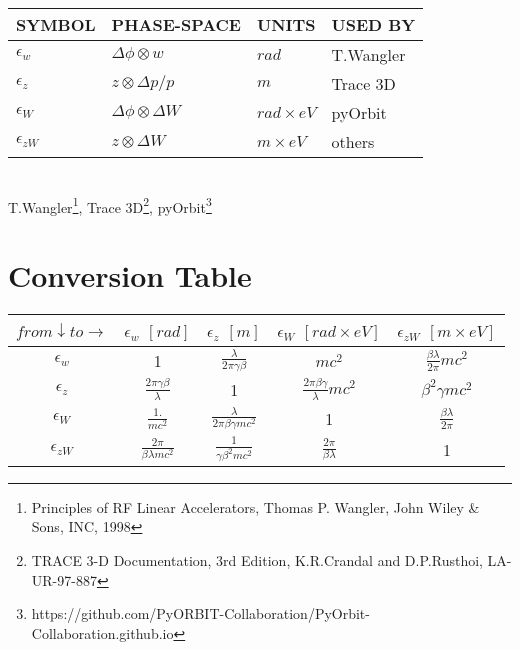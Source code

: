 \documentclass{article}
\begin{document}
\begin{tabular}{|l|l|l|l|}
\hline
SYMBOL   & PHASE-SPACE  &  UNITS & USED BY\\

\hline
$\epsilon_{w}$  & $ \Delta\phi \otimes w$ & $rad$ & T.Wangler \\

\hline
$\epsilon_{z}$  & $z \otimes \Delta p/p$  & $m$ & Trace 3D \\

\hline
$\epsilon_{W}$  & $\Delta\phi \otimes \Delta W$  & $rad\times eV$ & pyOrbit\\

\hline
$\epsilon_{zW}$ & $z \otimes \Delta W$ & $m \times eV$ & others \\

\hline
\end{tabular} \\

T.Wangler\footnote {Principles of RF Linear Accelerators, Thomas P. Wangler, John Wiley \& Sons, INC, 1998},
Trace 3D\footnote {TRACE 3-D Documentation, 3rd Edition, K.R.Crandal and D.P.Rusthoi, LA-UR-97-887},
pyOrbit\footnote{https://github.com/PyORBIT-Collaboration/PyOrbit-Collaboration.github.io} \\
\section{Conversion Table}


\begin{tabular}{|c|c|c|c|c|}
\hline
 $from\downarrow to\rightarrow$ & $\epsilon_{w}$     $[rad]$ & $\epsilon_{z}$     $[m]$ & $\epsilon_{W}$   $[rad\times eV]$ & $\epsilon_{zW}$   $[m\times eV]$   \\
\hline
$\epsilon_{w}$ & 1 & $\frac{\lambda} {2 \pi \gamma \beta}$ & $mc^{2}$ & $\frac{\beta \lambda} {2 \pi}mc^{2}$  \\
$\epsilon_{z}$ & $\frac{2 \pi \gamma \beta}{\lambda}$ & 1 & $\frac{2\pi\beta\gamma} {\lambda} mc^{2}$ & $\beta^{2}\gamma mc^{2}$  \\
$\epsilon_{W}$ & $\frac{1.} {mc^{2}}$ & $\frac{\lambda}{2\pi\beta\gamma mc^{2}}$ &   1 & $\frac{\beta\lambda}{2\pi}$  \\
$\epsilon_{zW}$ & $\frac{2 \pi} {\beta \lambda mc^{2}} $ & $\frac{1}{\gamma\beta^{2}mc^{2}}$ & $\frac{2\pi}{\beta\lambda}$ & 1  \\
\hline
\end{tabular}
\end{document}
